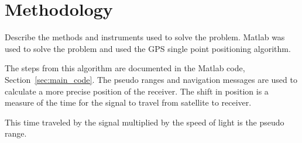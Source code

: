 \section{Methodology} 

\label{sec:methodology}

Describe the methods and instruments used to solve the problem. Matlab was used to solve the problem and used the GPS single point positioning algorithm.\cite{milanGPS} 

\noindent The steps from this algorithm are documented in the Matlab code, Section~\ref{sec:main_code}. The pseudo ranges and navigation messages are used to calculate a more precise position of the receiver.  The shift in position is a measure of the time for the signal to travel from satellite to receiver. 

This time traveled by the signal multiplied by the speed of light is the pseudo range.   



